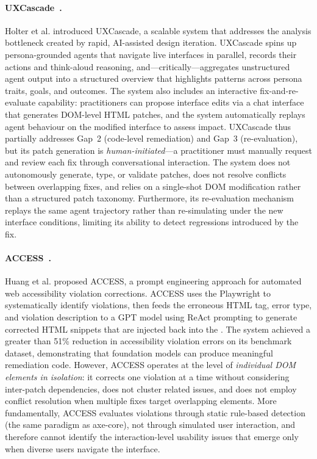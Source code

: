 \paragraph{UXCascade~\cite{uxcascade}.}
Holter et al. introduced UXCascade, a scalable system that addresses the analysis bottleneck created by rapid, AI-assisted design iteration. UXCascade spins up persona-grounded  agents that navigate live interfaces in parallel, records their actions and think-aloud reasoning, and---critically---aggregates unstructured agent output into a structured overview that highlights patterns across persona traits, goals, and outcomes. The system also includes an interactive fix-and-re-evaluate capability: practitioners can propose interface edits via a chat interface that generates DOM-level HTML patches, and the system automatically replays agent behaviour on the modified interface to assess impact. UXCascade thus partially addresses Gap~2 (code-level remediation) and Gap~3 (re-evaluation), but its patch generation is \textit{human-initiated}---a practitioner must manually request and review each fix through conversational interaction. The system does not autonomously generate, type, or validate patches, does not resolve conflicts between overlapping fixes, and relies on a single-shot DOM modification rather than a structured patch taxonomy. Furthermore, its re-evaluation mechanism replays the same agent trajectory rather than re-simulating under the new interface conditions, limiting its ability to detect regressions introduced by the fix.

\paragraph{ACCESS~\cite{access}.}
Huang et al. proposed ACCESS, a prompt engineering approach for automated web accessibility violation corrections. ACCESS uses the Playwright  to systematically identify  violations, then feeds the erroneous HTML tag, error type, and violation description to a GPT model using ReAct prompting to generate corrected HTML snippets that are injected back into the . The system achieved a greater than 51\% reduction in accessibility violation errors on its benchmark dataset, demonstrating that foundation models can produce meaningful remediation code. However, ACCESS operates at the level of \textit{individual DOM elements in isolation}: it corrects one violation at a time without considering inter-patch dependencies, does not cluster related issues, and does not employ conflict resolution when multiple fixes target overlapping elements. More fundamentally, ACCESS evaluates violations through static rule-based detection (the same paradigm as axe-core), not through simulated user interaction, and therefore cannot identify the interaction-level usability issues that emerge only when diverse users navigate the interface.

